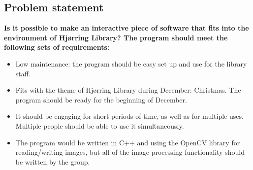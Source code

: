 \subsection{Problem statement}\label{problemStatement}
\textbf{Is it possible to make an interactive piece of software that fits into the environment of Hj{\o}rring Library? The program should meet the following sets of requirements:}

\begin{itemize}
\item Low maintenance: the program should be easy set up and use for the library staff.
\item Fits with the theme of Hj{\o}rring Library during December: Christmas. The program should be ready for the beginning of December.
\item It should be engaging for short periods of time, as well as for multiple uses. Multiple people should be able to use it simultaneously.
\item The program would be written in C++ and using the OpenCV library for reading/writing images, but all of the image processing functionality should be written by the group.
\end{itemize}
